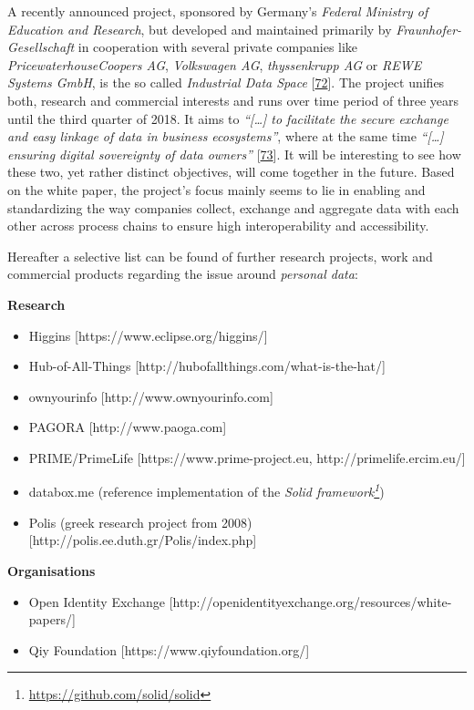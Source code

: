 \documentclass[12pt,english,a4paper,titlepage,cleardoublepage=empty,dottedtoc]{report}
\renewcommand{\href}[2]{#2\footnote{\url{#1}}}
\providecommand{\tightlist}{%
  \setlength{\itemsep}{0pt}\setlength{\parskip}{0pt}}
\begin{document}
A recently announced project, sponsored by Germany's \emph{Federal
Ministry of Education and Research}, but developed and maintained
primarily by \emph{Fraunhofer-Gesellschaft} in cooperation with several
private companies like \emph{PricewaterhouseCoopers AG},
\emph{Volkswagen AG}, \emph{thyssenkrupp AG} or \emph{REWE Systems
GmbH}, is the so called \emph{Industrial Data Space}
{[}\protect\hyperlink{ref-web_industrial-data-space}{72}{]}. The project
unifies both, research and commercial interests and runs over time
period of three years until the third quarter of 2018. It aims to
\emph{``{[}\ldots{}{]} to facilitate the secure exchange and easy
linkage of data in business ecosystems''}, where at the same time
\emph{``{[}\ldots{}{]} ensuring digital sovereignty of data owners''}
{[}\protect\hyperlink{ref-whitepaper_2016_industrial-data-space}{73}{]}.
It will be interesting to see how these two, yet rather distinct
objectives, will come together in the future. Based on the white paper,
the project's focus mainly seems to lie in enabling and standardizing
the way companies collect, exchange and aggregate data with each other
across process chains to ensure high interoperability and accessibility.

Hereafter a selective list can be found of further research projects,
work and commercial products regarding the issue around \emph{personal
data}:

\textbf{Research}

\begin{itemize}
\tightlist
\item
  Higgins {[}https://www.eclipse.org/higgins/{]}
\item
  Hub-of-All-Things {[}http://hubofallthings.com/what-is-the-hat/{]}
\item
  ownyourinfo {[}http://www.ownyourinfo.com{]}
\item
  PAGORA {[}http://www.paoga.com{]}
\item
  PRIME/PrimeLife {[}https://www.prime-project.eu,
  http://primelife.ercim.eu/{]}
\item
  databox.me (reference implementation of the
  \emph{\href{https://github.com/solid/solid}{Solid framework}})
\item
  Polis (greek research project from 2008)
  {[}http://polis.ee.duth.gr/Polis/index.php{]}
\end{itemize}

\textbf{Organisations}

\begin{itemize}
\tightlist
\item
  Open Identity Exchange
  {[}http://openidentityexchange.org/resources/white-papers/{]}
\item
  Qiy Foundation {[}https://www.qiyfoundation.org/{]}
\end{itemize}
\end{document}
